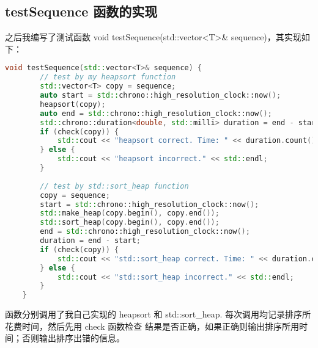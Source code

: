 \documentclass[UTF8]{ctexart}
\begin{document}
\subsection{testSequence 函数的实现}
之后我编写了测试函数 void testSequence(std::vector<T>\& sequence)，其实现如下：
\begin{lstlisting}[language=c++, breaklines=true, keywordstyle=\color{blue!70}, commentstyle=\color{red!50!green!50!blue!50}, frame=shadowbox, rulesepcolor=\color{red!20!green!20!blue!20}]
    void testSequence(std::vector<T>& sequence) {
        // test by my heapsort function
        std::vector<T> copy = sequence;
        auto start = std::chrono::high_resolution_clock::now();
        heapsort(copy);
        auto end = std::chrono::high_resolution_clock::now();
        std::chrono::duration<double, std::milli> duration = end - start;
        if (check(copy)) {
            std::cout << "heapsort correct. Time: " << duration.count() << " ms" << std::endl;
        } else {
            std::cout << "heapsort incorrect." << std::endl;
        }
    
        // test by std::sort_heap function
        copy = sequence;
        start = std::chrono::high_resolution_clock::now();
        std::make_heap(copy.begin(), copy.end());
        std::sort_heap(copy.begin(), copy.end());
        end = std::chrono::high_resolution_clock::now();
        duration = end - start;
        if (check(copy)) {
            std::cout << "std::sort_heap correct. Time: " << duration.count() << " ms" << std::endl;
        } else {
            std::cout << "std::sort_heap incorrect." << std::endl;
        }
    }
\end{lstlisting}

函数分别调用了我自己实现的 heapsort 和 std::sort\_heap. 每次调用均记录排序所花费时间，然后先用 check 函数检查
结果是否正确，如果正确则输出排序所用时间；否则输出排序出错的信息。
\end{document}
